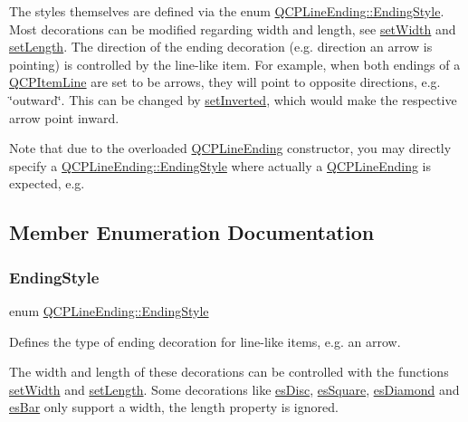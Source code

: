 The styles themselves are defined via the enum \hyperlink{classQCPLineEnding_a5ef16e6876b4b74959c7261d8d4c2cd5}{Q\+C\+P\+Line\+Ending\+::\+Ending\+Style}. Most decorations can be modified regarding width and length, see \hyperlink{classQCPLineEnding_a26dc020ea985a72cc25881ce2115e34e}{set\+Width} and \hyperlink{classQCPLineEnding_ae36fa01763751cd64b7f56c3507e935a}{set\+Length}. The direction of the ending decoration (e.\+g. direction an arrow is pointing) is controlled by the line-\/like item. For example, when both endings of a \hyperlink{classQCPItemLine}{Q\+C\+P\+Item\+Line} are set to be arrows, they will point to opposite directions, e.\+g. \char`\"{}outward\char`\"{}. This can be changed by \hyperlink{classQCPLineEnding_a580e4e2360b35ebb8d68f3494aa2335d}{set\+Inverted}, which would make the respective arrow point inward.

Note that due to the overloaded \hyperlink{classQCPLineEnding}{Q\+C\+P\+Line\+Ending} constructor, you may directly specify a \hyperlink{classQCPLineEnding_a5ef16e6876b4b74959c7261d8d4c2cd5}{Q\+C\+P\+Line\+Ending\+::\+Ending\+Style} where actually a \hyperlink{classQCPLineEnding}{Q\+C\+P\+Line\+Ending} is expected, e.\+g. 
\begin{DoxyCodeInclude}
\end{DoxyCodeInclude}


\subsection{Member Enumeration Documentation}
\mbox{\label{classQCPLineEnding_a5ef16e6876b4b74959c7261d8d4c2cd5}} 
\subsubsection{\texorpdfstring{Ending\+Style}{EndingStyle}}
{\footnotesize\ttfamily enum \hyperlink{classQCPLineEnding_a5ef16e6876b4b74959c7261d8d4c2cd5}{Q\+C\+P\+Line\+Ending\+::\+Ending\+Style}}

Defines the type of ending decoration for line-\/like items, e.\+g. an arrow.



The width and length of these decorations can be controlled with the functions \hyperlink{classQCPLineEnding_a26dc020ea985a72cc25881ce2115e34e}{set\+Width} and \hyperlink{classQCPLineEnding_ae36fa01763751cd64b7f56c3507e935a}{set\+Length}. Some decorations like \hyperlink{classQCPLineEnding_a5ef16e6876b4b74959c7261d8d4c2cd5ae5a3414916817258bcc6dddd605e8f5c}{es\+Disc}, \hyperlink{classQCPLineEnding_a5ef16e6876b4b74959c7261d8d4c2cd5ae1836502fa43d8990bb62b2d493a140a}{es\+Square}, \hyperlink{classQCPLineEnding_a5ef16e6876b4b74959c7261d8d4c2cd5a378fe5a8b768411b0bc1765210fe7200}{es\+Diamond} and \hyperlink{classQCPLineEnding_a5ef16e6876b4b74959c7261d8d4c2cd5a2cf543bbca332df26d89bf779f50469f}{es\+Bar} only support a width, the length property is ignored.

